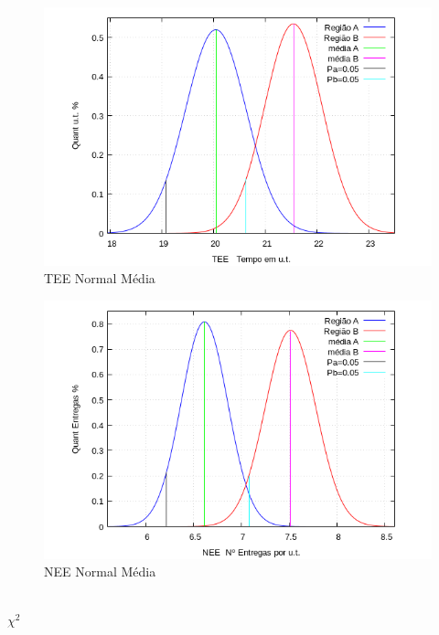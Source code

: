 \begin{minipage}[!b]{0.45\linewidth}
	\begin{figure}[H]
		\centering
		\includegraphics[scale=0.4]{./image/ESTAT/TEE_MEDIA_DIST.png}
		\caption{TEE Normal Média}
		\label{TEEMED}
	\end{figure}
\end{minipage}
\hspace{1cm}
\begin{minipage}[!b]{0.45\linewidth}
	\begin{figure}[H]
		\centering
		\includegraphics[scale=0.4]{./image/ESTAT/NEE_MEDIA_DIST.png}
		\caption{NEE Normal Média}
		\label{NEEMED}
	\end{figure}
\end{minipage} \\
$\chi^2$
